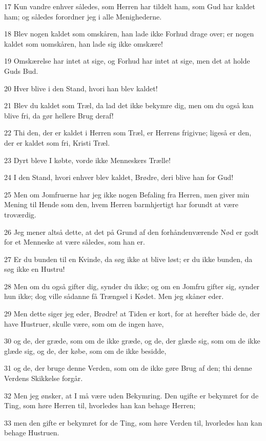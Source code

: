 \par 17 Kun vandre enhver således, som Herren har tildelt ham, som Gud har kaldet ham; og således forordner jeg i alle Menighederne.
\par 18 Blev nogen kaldet som omskåren, han lade ikke Forhud drage over; er nogen kaldet som uomskåren, han lade sig ikke omskære!
\par 19 Omskærelse har intet at sige, og Forhud har intet at sige, men det at holde Guds Bud.
\par 20 Hver blive i den Stand, hvori han blev kaldet!
\par 21 Blev du kaldet som Træl, da lad det ikke bekymre dig, men om du også kan blive fri, da gør hellere Brug deraf!
\par 22 Thi den, der er kaldet i Herren som Træl, er Herrens frigivne; ligeså er den, der er kaldet som fri, Kristi Træl.
\par 23 Dyrt bleve I købte, vorde ikke Menneskers Trælle!
\par 24 I den Stand, hvori enhver blev kaldet, Brødre, deri blive han for Gud!
\par 25 Men om Jomfruerne har jeg ikke nogen Befaling fra Herren, men giver min Mening til Hende som den, hvem Herren barmhjertigt har forundt at være troværdig.
\par 26 Jeg mener altså dette, at det på Grund af den forhåndenværende Nød er godt for et Menneske at være således, som han er.
\par 27 Er du bunden til en Kvinde, da søg ikke at blive løst; er du ikke bunden, da søg ikke en Hustru!
\par 28 Men om du også gifter dig, synder du ikke; og om en Jomfru gifter sig, synder hun ikke; dog ville sådanne få Trængsel i Kødet. Men jeg skåner eder.
\par 29 Men dette siger jeg eder, Brødre! at Tiden er kort, for at herefter både de, der have Hustruer, skulle være, som om de ingen have,
\par 30 og de, der græde, som om de ikke græde, og de, der glæde sig, som om de ikke glæde sig, og de, der købe, som om de ikke besidde,
\par 31 og de, der bruge denne Verden, som om de ikke gøre Brug af den; thi denne Verdens Skikkelse forgår.
\par 32 Men jeg ønsker, at I må være uden Bekymring. Den ugifte er bekymret for de Ting, som høre Herren til, hvorledes han kan behage Herren;
\par 33 men den gifte er bekymret for de Ting, som høre Verden til, hvorledes han kan behage Hustruen.
